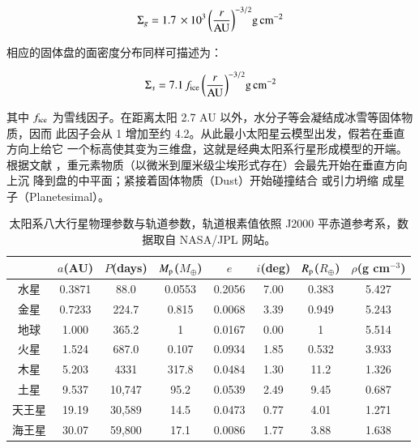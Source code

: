 \begin{equation} \label{eq:mmsng}
\Sigma_g = 1.7 \,\times10^3 \, \bigg(\frac{r}{\mathrm{AU}}\bigg)^{-3/2}  \mathrm{g} \,\mathrm{cm}^{-2}
\end{equation} %

相应的固体盘的面密度分布同样可描述为：

\begin{equation} \label{eq:mmsns}
\Sigma_s = 7.1 \, f_\mathrm{ice} \, \bigg(\frac{r}{\mathrm{AU}}\bigg)^{-3/2}  \mathrm{g} \,\mathrm{cm}^{-2}
\end{equation} %

其中 $f_\mathrm{ice}$ 为雪线因子。在距离太阳 2.7 AU 以外，水分子等会凝结成冰雪等固体物质，因而
此因子会从 1 增加至约 4.2\cite{IdaLin2004}。从此最小太阳星云模型出发，假若在垂直方向上给它
一个标高使其变为三维盘，这就是经典太阳系行星形成模型的开端。根据文献 
，重元素物质（以微米到厘米级尘埃形式存在）会最先开始在垂直方向上沉
降到盘的中平面；紧接着固体物质（Dust）开始碰撞结合
\cite{ppvibook2014,Weidenschilling1997,BlumWurm2008}或引力坍缩
\cite{Safronov1972,GoldreichWard1973,YoudinShu2002,ChiangYoudin2010}成星子（Planetesimal）。

\begin{table}[t]
\centering
\caption{太阳系八大行星物理参数与轨道参数，轨道根素值依照 J2000 平赤道参考系，数据取自 NASA/JPL 网站。}
\label{tbl:solarsystem}
\begin{tabular}{cccccccc}
\hline \hline
  & $a$(AU) & $P$(days) & $M_\mathrm{p}$($M_\oplus$) &  $e$ &  $i$(deg) &  $R_\mathrm{p}$($R_\oplus$) & $\rho$(g cm$^{-3}$) \\ \hline
水星        &   0.3871    &   88.0      &  0.0553    & 0.2056  &  7.00    &   0.383   &   5.427      \\
金星        &   0.7233    &   224.7    &  0.815      & 0.0068  &  3.39    &   0.949   &   5.243      \\
地球        &   1.000      &   365.2     &  1            & 0.0167 &   0.00    &   1          &   5.514      \\
火星        &   1.524      &   687.0     &  0.107     & 0.0934 &   1.85    &   0.532   &   3.933      \\
木星        &   5.203      &   4331      &  317.8     & 0.0484  &  1.30    &   11.2     &   1.326      \\
土星        &    9.537     &   10,747   &  95.2       & 0.0539 &    2.49   &   9.45     &   0.687      \\
天王星     &   19.19     &    30,589   &  14.5       & 0.0473 &   0.77    &   4.01     &  1.271       \\
海王星     &   30.07     &    59,800   &  17.1       & 0.0086 &    1.77   &    3.88    &  1.638       \\
\hline \hline
\end{tabular}
\end{table}

